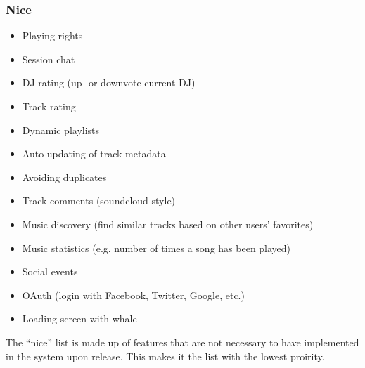 \subsubsection{Nice}


\begin{itemize}
	\item Playing rights 
	\item Session chat
	\item DJ rating (up- or downvote current DJ)
	\item Track rating
	\item Dynamic playlists
	\item Auto updating of track metadata
	\item Avoiding duplicates
	\item Track comments (soundcloud style)
	\item Music discovery (find similar tracks based on other users' favorites)
	\item Music statistics (e.g. number of times a song has been played) 
	\item Social events 
	\item OAuth (login with Facebook, Twitter, Google, etc.)
	\item Loading screen with whale
\end{itemize}


The ``nice'' list is made up of features that are not necessary to have implemented in the
system upon release. This makes it the list with the lowest proirity.
